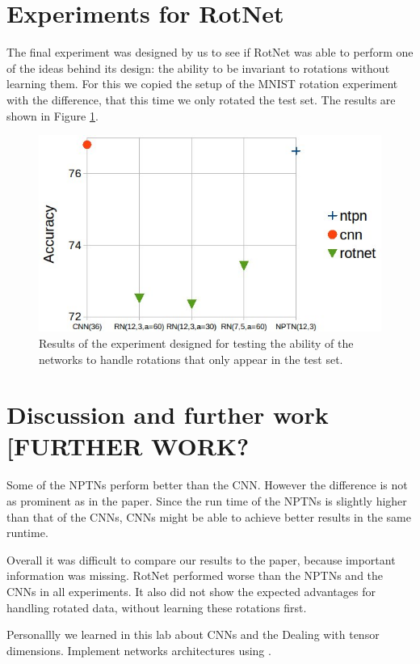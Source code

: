 \documentclass{llncs}
\begin{document}
\section{Experiments for RotNet}
The final experiment was designed by us to see if RotNet was able to perform one of the ideas behind its design: the ability to be invariant to rotations without learning them.
For this we copied the setup of the MNIST rotation experiment with the difference, that this time we only rotated the test set. The results are shown in Figure \ref{pic:experiment4}. 


\begin{figure}
	\begin{center}
	\includegraphics[scale=0.35]{result_images/experiment4.jpg}
	\caption{Results of the experiment designed for testing the ability of the networks to handle rotations that only appear in the test set.}
	\label{pic:experiment4}
	\end{center}
\end{figure}



\section{Discussion and further work [FURTHER WORK?}
Some of the NPTNs perform better than the CNN. However the difference is not as prominent as in the paper. Since the run time of the NPTNs is slightly higher than that of the CNNs, CNNs might be able to achieve better results in the same runtime.

Overall it was difficult to compare our results to the paper, because important information was missing. 
RotNet performed worse than the NPTNs and the CNNs in all experiments.
It also did not show the expected advantages for handling rotated data, without learning these rotations first. 


Personallly we learned in this lab about CNNs and the 
Dealing with tensor dimensions.
Implement networks architectures using \pytorch.

\printbibliography
\end{document}
